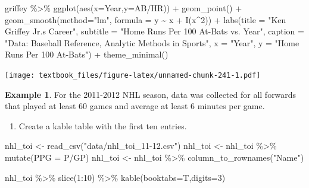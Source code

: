 \documentclass[
  11pt,
]{book}
\newenvironment{Shaded}{\begin{snugshade}}{\end{snugshade}}
\newcommand{\AttributeTok}[1]{\textcolor[rgb]{0.77,0.63,0.00}{#1}}
\newcommand{\DecValTok}[1]{\textcolor[rgb]{0.00,0.00,0.81}{#1}}
\newcommand{\FunctionTok}[1]{\textcolor[rgb]{0.00,0.00,0.00}{#1}}
\newcommand{\NormalTok}[1]{#1}
\newcommand{\OtherTok}[1]{\textcolor[rgb]{0.56,0.35,0.01}{#1}}
\newcommand{\SpecialCharTok}[1]{\textcolor[rgb]{0.00,0.00,0.00}{#1}}
\newcommand{\StringTok}[1]{\textcolor[rgb]{0.31,0.60,0.02}{#1}}
\providecommand{\tightlist}{%
  \setlength{\itemsep}{0pt}\setlength{\parskip}{0pt}}
\theoremstyle{definition}
\theoremstyle{definition}
\newtheorem{example}{Example}[chapter]
\theoremstyle{definition}
\theoremstyle{definition}
\theoremstyle{remark}
\begin{document}
\newpage

\begin{Shaded}
\begin{Highlighting}[]
\NormalTok{griffey }\SpecialCharTok{\%\textgreater{}\%} \FunctionTok{ggplot}\NormalTok{(}\FunctionTok{aes}\NormalTok{(}\AttributeTok{x=}\NormalTok{Year,}\AttributeTok{y=}\StringTok{\textasciigrave{}}\AttributeTok{AB/HR}\StringTok{\textasciigrave{}}\NormalTok{)) }\SpecialCharTok{+}
  \FunctionTok{geom\_point}\NormalTok{() }\SpecialCharTok{+}
  \FunctionTok{geom\_smooth}\NormalTok{(}\AttributeTok{method=}\StringTok{"lm"}\NormalTok{, }\AttributeTok{formula =}\NormalTok{ y }\SpecialCharTok{\textasciitilde{}}\NormalTok{ x }\SpecialCharTok{+} \FunctionTok{I}\NormalTok{(x}\SpecialCharTok{\^{}}\DecValTok{2}\NormalTok{)) }\SpecialCharTok{+} 
  \FunctionTok{labs}\NormalTok{(}\AttributeTok{title =} \StringTok{"Ken Griffey Jr.\textquotesingle{}s Career"}\NormalTok{,}
       \AttributeTok{subtitle =} \StringTok{"Home Runs Per 100 At{-}Bats vs. Year"}\NormalTok{,}
       \AttributeTok{caption =} \StringTok{"Data: Baseball Reference, Analytic Methods in Sports"}\NormalTok{, }
       \AttributeTok{x =} \StringTok{"Year"}\NormalTok{,}
       \AttributeTok{y =} \StringTok{"Home Runs Per 100 At{-}Bats"}\NormalTok{) }\SpecialCharTok{+}
  \FunctionTok{theme\_minimal}\NormalTok{()}
\end{Highlighting}
\end{Shaded}

\texttt{[image: textbook\_files/figure-latex/unnamed-chunk-241-1.pdf]}

\newpage

\begin{example}
For the 2011-2012 NHL season, data was collected for all forwards that played at least 60 games and average at least 6 minutes per game.
\end{example}

\begin{enumerate}
\def\labelenumi{(\alph{enumi})}
\tightlist
\item
  Create a kable table with the first ten entries.
\end{enumerate}

\begin{Shaded}
\begin{Highlighting}[]
\NormalTok{nhl\_toi }\OtherTok{\textless{}{-}} \FunctionTok{read\_csv}\NormalTok{(}\StringTok{"data/nhl\_toi\_11{-}12.csv"}\NormalTok{)}
\NormalTok{nhl\_toi }\OtherTok{\textless{}{-}}\NormalTok{ nhl\_toi }\SpecialCharTok{\%\textgreater{}\%} \FunctionTok{mutate}\NormalTok{(}\AttributeTok{PPG =}\NormalTok{ P}\SpecialCharTok{/}\NormalTok{GP)}
\NormalTok{nhl\_toi }\OtherTok{\textless{}{-}}\NormalTok{ nhl\_toi }\SpecialCharTok{\%\textgreater{}\%} \FunctionTok{column\_to\_rownames}\NormalTok{(}\StringTok{"Name"}\NormalTok{)}

\NormalTok{nhl\_toi }\SpecialCharTok{\%\textgreater{}\%} \FunctionTok{slice}\NormalTok{(}\DecValTok{1}\SpecialCharTok{:}\DecValTok{10}\NormalTok{) }\SpecialCharTok{\%\textgreater{}\%} \FunctionTok{kable}\NormalTok{(}\AttributeTok{booktabs=}\NormalTok{T,}\AttributeTok{digits=}\DecValTok{3}\NormalTok{)}
\end{Highlighting}
\end{Shaded}
\end{document}
